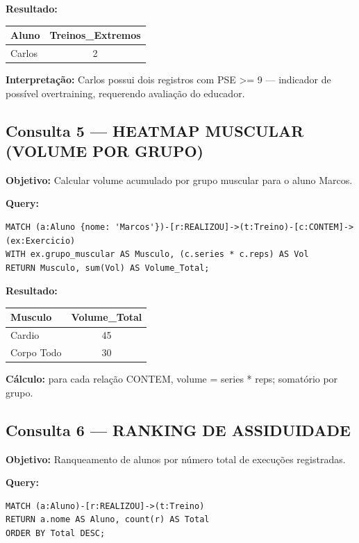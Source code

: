 \documentclass[12pt,a4paper]{article}
\begin{document}
\textbf{Resultado:}
\begin{table}[h]
\centering
\begin{tabular}{lc}
\toprule
Aluno & Treinos\_Extremos \\
\midrule
Carlos & 2 \\
\bottomrule
\end{tabular}
\end{table}

\textbf{Interpretação:} Carlos possui dois registros com PSE >= 9 — indicador de possível overtraining, requerendo avaliação do educador.

\subsection{Consulta 5 — HEATMAP MUSCULAR (VOLUME POR GRUPO)}

\textbf{Objetivo:} Calcular volume acumulado por grupo muscular para o aluno Marcos.

\textbf{Query:}
\lstset{caption=Consulta 5 - Heatmap Muscular}
\begin{lstlisting}
MATCH (a:Aluno {nome: 'Marcos'})-[r:REALIZOU]->(t:Treino)-[c:CONTEM]->(ex:Exercicio)
WITH ex.grupo_muscular AS Musculo, (c.series * c.reps) AS Vol
RETURN Musculo, sum(Vol) AS Volume_Total;
\end{lstlisting}

\textbf{Resultado:}
\begin{table}[h]
\centering
\begin{tabular}{lc}
\toprule
Musculo & Volume\_Total \\
\midrule
Cardio & 45 \\
Corpo Todo & 30 \\
\bottomrule
\end{tabular}
\end{table}

\textbf{Cálculo:} para cada relação CONTEM, volume = series * reps; somatório por grupo.

\subsection{Consulta 6 — RANKING DE ASSIDUIDADE}

\textbf{Objetivo:} Ranqueamento de alunos por número total de execuções registradas.

\textbf{Query:}
\lstset{caption=Consulta 6 - Ranking de Assiduidade}
\begin{lstlisting}
MATCH (a:Aluno)-[r:REALIZOU]->(t:Treino)
RETURN a.nome AS Aluno, count(r) AS Total
ORDER BY Total DESC;
\end{lstlisting}
\end{document}
